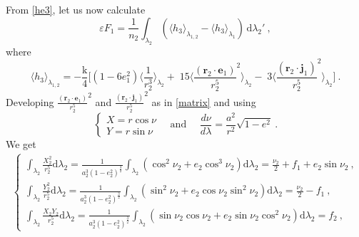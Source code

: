\documentclass[a4paper]{article}
\begin{document}
\subsection{}
\label{averagingF1}
From \eqref{he3}, let us now calculate
\begin{equation}
\varepsilon F_{1}=\frac{1}{n_{2}} \int_{\lambda_{2}}^{} ( \langle h_{3} \rangle _{\lambda_{1,2}}- \langle h_{3} \rangle _{\lambda_{1}}) \, \mathrm d \lambda_{2}' \ ,
\end{equation}
where
\begin{equation}
 \langle h_{3} \rangle _{\lambda_{1,2}}=-\frac{\mathrm k}{4}\biggl[(1-6e_{1}^{2}) \langle \frac{1}{r_{2}^{3}} \rangle _{\lambda_{2}}
+\; 15 \langle \frac{(\mathbf r_{2} \cdot \mathbf e_{1})}{r_{2}^{5}}^{2} \rangle _{\lambda_{2}}-\; 3 \langle \frac{(\mathbf r_{2} \cdot \mathbf j_{1})}{r_{2}^{5}}^{2} \rangle _{\lambda_{2}}\biggr] \ .
\label{h33}
\end{equation}
Developing $\frac{(\mathbf r_{2} \cdot \mathbf e_{1})}{r_{2}^{5}}^{2}$ and $\frac{(\mathbf r_{2} \cdot \mathbf j_{1})}{r_{2}^{5}}^{2}$ as in \eqref{matrix} and using
\begin{equation}
\begin{cases}
X=r\cos{\nu} \\
Y=r\sin{\nu}
\end{cases}  
\quad
\text{and }
\quad
\frac{d\nu}{d\lambda}=\frac{a^{2}}{r^{2}}\sqrt{1-e^{2}} \ .
\label{nu}
\end{equation}
We get
\begin{align}
\begin{cases}
\int_{\lambda_{2}}^{} \frac{X_{2}^{2}}{r_{2}^{5}} \mathrm d\lambda_{2}=\frac{1}{a_{2}^{3}(1-e_{2}^{2})^{\frac{3}{2}}} \int_{\lambda_{2}}^{} (\cos^{2}{\nu_{2}}+e_{2}\cos^{3}{\nu_{2}}) \mathrm d\lambda_{2}
=\frac{\nu_{2}}{2}+f_{1}+e_{2}\sin{\nu_{2}} \ , \\
\int_{\lambda_{2}}^{} \frac{Y_{2}^{2}}{r_{2}^{5}} \mathrm d\lambda_{2}=\frac{1}{a_{2}^{3}(1-e_{2}^{2})^{\frac{3}{2}}} \int_{\lambda_{2}}^{} (\sin^{2}{\nu_{2}}+e_{2}\cos{\nu_{2}}\sin^{2}{\nu_{2}}) \mathrm d\lambda_{2}
= \frac{\nu_{2}}{2}-f_{1} \ , \\
\int_{\lambda_{2}}^{} \frac{X_{2}Y_{2}}{r_{2}^{5}} \mathrm d\lambda_{2}=\frac{1}{a_{2}^{3}(1-e_{2}^{2})^{\frac{3}{2}}} \int_{\lambda_{2}}^{} (\sin{\nu_{2}}\cos{\nu_{2}}+e_{2}\sin{\nu_{2}}\cos^{2}{\nu_{2}}) \mathrm d\lambda_{2}=f_{2} \ ,
\end{cases}
\end{align}
\end{document}

